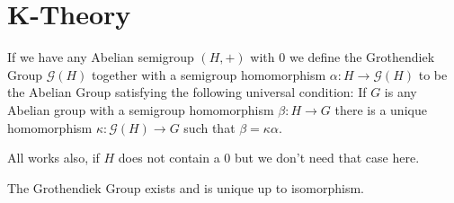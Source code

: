 \section{K-Theory}
\begin{definition}
	If we have any Abelian semigroup $(H,+)$ with $0$ we define the Grothendiek Group $\mathcal{G}(H)$ together with a semigroup homomorphism $\alpha:H\to \mathcal{G}(H)$ to be the Abelian Group satisfying the following universal condition: 
	If $G$ is any Abelian group with a semigroup homomorphism ${\beta: H\to G}$ there is a unique homomorphism $\kappa: \mathcal{G}(H)\to G$ such that $\beta=\kappa\alpha$.
\end{definition}
\begin{remark}
	All works also, if $H$ does not contain a $0$ but we don't need that case here.
\end{remark}
\begin{remark}
	The Grothendiek Group exists and is unique up to isomorphism.
\end{remark}
